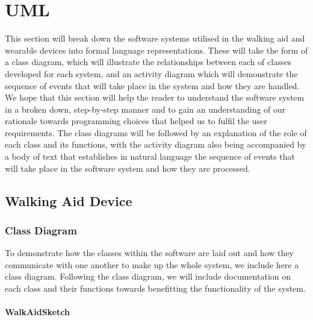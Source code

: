                 
    \section{UML}
    \label{sec:uml}
    
        This section will break down the software systems utilised in the walking aid and wearable devices into formal language representations. These will take the form of a class diagram, which will illustrate the relationships between each of classes developed for each system, and an activity diagram which will demonstrate the sequence of events that will take place in the system and how they are handled. We hope that this section will help the reader to understand the software system in a broken down, step-by-step manner and to gain an understanding of our rationale towards programming choices that helped us to fulfil the user requirements. The class diagrams will be followed by an explanation of the role of each class and its functions, with the activity diagram also being accompanied by a body of text that establishes in natural language the sequence of events that will take place in the software system and how they are processed.

        \subsection{Walking Aid Device}
        \label{subsec:walking_aid_device_uml}

            \subsubsection{Class Diagram}
            \label{subsubsec:class_diagram_walking_aid}

                To demonstrate how the classes within the software are laid out and how they communicate with one another to make up the whole system, we include here a class diagram. Following the class diagram, we will include documentation on each class and their functions towards benefitting the functionality of the system. 

                \clearpage
                \thispagestyle{empty}
                \begin{landscape}
                    
                \end{landscape}

                \paragraph{WalkAidSketch}\mbox{}

